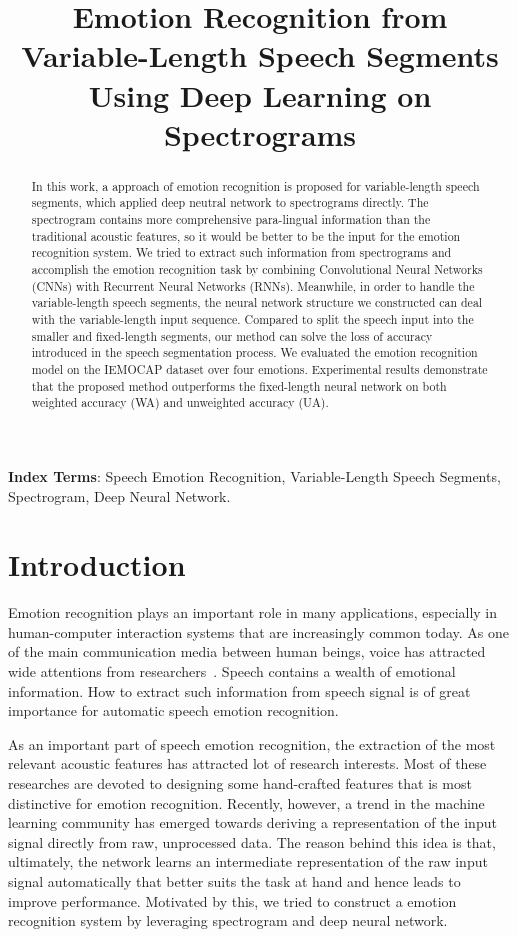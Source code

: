 \documentclass[a4paper]{article}
\title{Emotion Recognition from Variable-Length Speech Segments Using Deep Learning on Spectrograms}
\begin{document}
\maketitle
%
\begin{abstract}
In this work, a approach of emotion recognition is proposed for variable-length speech segments, which applied deep neutral network to spectrograms directly. The spectrogram contains more comprehensive para-lingual information than the traditional acoustic features, so it would be better to be the input for the emotion recognition system. We tried to extract such information from spectrograms and accomplish the emotion recognition task by combining Convolutional
Neural Networks (CNNs) with Recurrent Neural Networks (RNNs). Meanwhile, in order to handle the variable-length speech segments, the neural network structure we constructed can deal with the variable-length input sequence. Compared to split the speech input into the smaller and fixed-length segments, our method can solve the loss of accuracy introduced in the speech segmentation process. We evaluated the emotion recognition model on the IEMOCAP dataset over four emotions. Experimental results demonstrate that the proposed method outperforms the fixed-length neural network on both weighted accuracy (WA) and unweighted accuracy (UA).
\end{abstract}

\noindent\textbf{Index Terms}: Speech Emotion Recognition, Variable-Length Speech Segments, Spectrogram, Deep Neural Network.

\section{Introduction}

Emotion recognition plays an important role in many applications, especially in human-computer interaction systems that are increasingly common today. As one of the main communication media between human beings, voice has attracted wide attentions from researchers~\cite{ayadi2011}. Speech contains a wealth of emotional information. How to extract such information from speech signal is of great importance for automatic speech emotion recognition.

As an important part of speech emotion recognition, the extraction of the most relevant acoustic features has attracted lot of research interests. Most of these researches are devoted to designing some hand-crafted features that is most distinctive for emotion recognition. Recently, however, a trend in the machine learning community has emerged towards deriving a representation of the input signal directly from raw, unprocessed data. The reason behind this idea is that, ultimately, the network learns an intermediate representation of the raw input signal automatically that better suits the task at hand and hence leads to improve performance. Motivated by this, we tried to construct a emotion recognition system by leveraging spectrogram and deep neural network.
\end{document}
